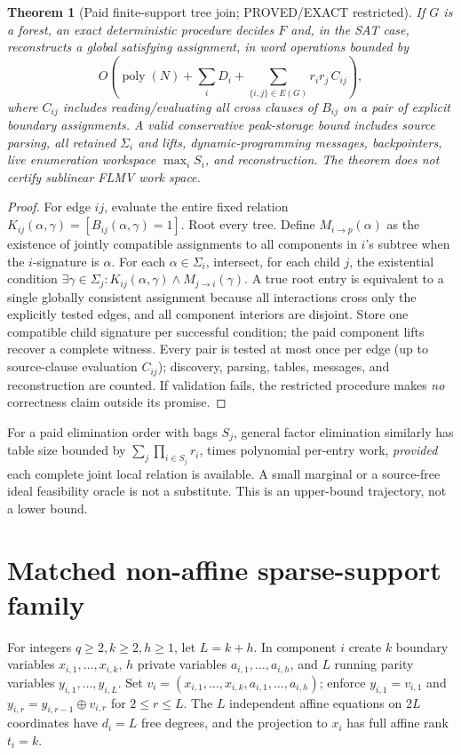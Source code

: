 \documentclass[11pt]{article}
\newtheorem{theorem}{Theorem}
\begin{document}
\begin{theorem}[Paid finite-support tree join; PROVED/EXACT restricted]
If \(G\) is a forest, an exact deterministic procedure decides \(F\)
and, in the SAT case, reconstructs a global satisfying assignment, in
word operations bounded by
\[
O\left(\operatorname{poly}(N)+\sum_iD_i+
  \sum_{\{i,j\}\in E(G)}r_i r_j\,C_{ij}\right),
\]
where \(C_{ij}\) includes reading/evaluating \emph{all} cross clauses of
\(B_{ij}\) on a pair of explicit boundary assignments.
A valid conservative peak-storage bound includes source parsing,
all retained \(\Sigma_i\) and lifts, dynamic-programming messages,
backpointers, live enumeration workspace \(\max_i S_i\), and reconstruction.
The theorem does not certify sublinear FLMV work space.
\end{theorem}
\begin{proof}
For edge \(ij\), evaluate the entire fixed relation
\(K_{ij}(\alpha,\gamma)=
[B_{ij}(\alpha,\gamma)=1]\). Root every tree.
Define \(M_{i\to p}(\alpha)\) as the existence of jointly compatible
assignments to all components in \(i\)'s subtree when the
\(i\)-signature is \(\alpha\). For each \(\alpha\in\Sigma_i\), intersect,
for each child \(j\), the existential condition
\(\exists\gamma\in\Sigma_j:
 K_{ij}(\alpha,\gamma)\wedge M_{j\to i}(\gamma)\).
A true root entry is equivalent to a single globally consistent
assignment because all interactions cross only the explicitly
tested edges, and all component interiors are disjoint.
Store one compatible child signature per successful condition;
the paid component lifts recover a complete witness.
Every pair is tested at most once per edge (up to source-clause
evaluation \(C_{ij}\)); discovery, parsing, tables, messages, and
reconstruction are counted. If validation fails, the restricted
procedure makes \emph{no} correctness claim outside its promise.
\end{proof}

For a paid elimination order with bags \(S_j\), general factor
elimination similarly has table size bounded by
\(\sum_j\prod_{i\in S_j}r_i\), times polynomial per-entry work,
\emph{provided} each complete joint local relation is available.
A small marginal or a source-free ideal feasibility oracle is not
a substitute. This is an upper-bound trajectory, not a lower bound.

\section{Matched non-affine sparse-support family}
For integers \(q\ge2,k\ge2,h\ge1\), let \(L=k+h\).
In component \(i\) create \(k\) boundary variables
\(x_{i,1},\ldots,x_{i,k}\), \(h\) private variables \(a_{i,1},\ldots,a_{i,h}\),
and \(L\) running parity variables \(y_{i,1},\ldots,y_{i,L}\).
Set \(v_i=(x_{i,1},\ldots,x_{i,k},a_{i,1},\ldots,a_{i,h})\);
enforce \(y_{i,1}=v_{i,1}\) and
\(y_{i,r}=y_{i,r-1}\oplus v_{i,r}\) for \(2\le r\le L\).
The \(L\) independent affine equations on \(2L\) coordinates have
\(d_i=L\) free degrees, and the projection to \(x_i\) has full
affine rank \(t_i=k\).
\end{document}
